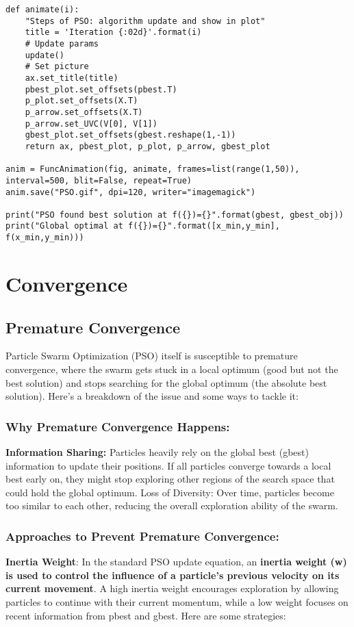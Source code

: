 \documentclass[12pt]{report}
\begin{document}
\begin{verbatim}
def animate(i):
    "Steps of PSO: algorithm update and show in plot"
    title = 'Iteration {:02d}'.format(i)
    # Update params
    update()
    # Set picture
    ax.set_title(title)
    pbest_plot.set_offsets(pbest.T)
    p_plot.set_offsets(X.T)
    p_arrow.set_offsets(X.T)
    p_arrow.set_UVC(V[0], V[1])
    gbest_plot.set_offsets(gbest.reshape(1,-1))
    return ax, pbest_plot, p_plot, p_arrow, gbest_plot
 
anim = FuncAnimation(fig, animate, frames=list(range(1,50)), interval=500, blit=False, repeat=True)
anim.save("PSO.gif", dpi=120, writer="imagemagick")
 
print("PSO found best solution at f({})={}".format(gbest, gbest_obj))
print("Global optimal at f({})={}".format([x_min,y_min], f(x_min,y_min)))
\end{verbatim}

\section{Convergence}
\subsection{Premature Convergence}
Particle Swarm Optimization (PSO) itself is susceptible to premature convergence, where the swarm gets stuck in a local optimum (good but not the best solution) and stops searching for the global optimum (the absolute best solution). Here's a breakdown of the issue and some ways to tackle it:

\subsubsection{Why Premature Convergence Happens:}
\textbf{
Information Sharing:} Particles heavily rely on the global best (gbest) information to update their positions. If all particles converge towards a local best early on, they might stop exploring other regions of the search space that could hold the global optimum.
Loss of Diversity: Over time, particles become too similar to each other, reducing the overall exploration ability of the swarm.
\subsubsection{Approaches to Prevent Premature Convergence:}

\textbf{Inertia Weight}: In the standard PSO update equation, an\textbf{ inertia weight (w) is used to control the influence of a particle's previous velocity on its current movement}. A high inertia weight encourages exploration by allowing particles to continue with their current momentum, while a low weight focuses on recent information from pbest and gbest.  Here are some strategies:
\end{document}
